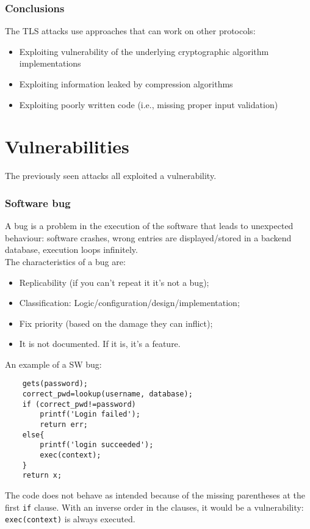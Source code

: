 \documentclass[a4paper, 10pt, titlepage]{article}
\begin{document}
\subsubsection{Conclusions}
The TLS attacks use approaches that can work on other protocols:
\begin{itemize}
	\item Exploiting vulnerability of the underlying cryptographic algorithm implementations
	\item Exploiting information leaked by compression algorithms
	\item Exploiting poorly written code (i.e., missing proper input validation)
\end{itemize}

\newpage
\section{Vulnerabilities}
The previously seen attacks all exploited a vulnerability.

\subsubsection*{Software bug}
A bug is a problem in the execution of the software that leads to unexpected behaviour: software crashes, wrong entries are displayed/stored in a backend database, execution loops infinitely. \\
The characteristics of a bug are:
\begin{itemize}
	\item Replicability (if you can't repeat it it's not a bug);
	\item Classification: Logic/configuration/design/implementation;
	\item Fix priority (based on the damage they can inflict);
	\item It is not documented. If it is, it’s a feature.
\end{itemize}
An example of a SW bug:
\begin{lstlisting}
	gets(password);
	correct_pwd=lookup(username, database);
	if (correct_pwd!=password)
		printf('Login failed');
		return err;
	else{
		printf('login succeeded');
		exec(context);
	}
	return x;
\end{lstlisting}
The code does not behave as intended because of the missing parentheses at the first \lstinline|if| clause. With an inverse order in the clauses, it would be a vulnerability: \lstinline|exec(context)| is always executed.
\end{document}
